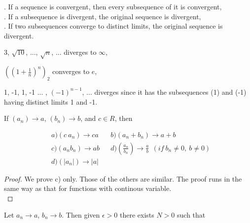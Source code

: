 \documentclass[11pt]{amsbook}
\begin{document}

	. If a sequence is convergent, then every subsequence of it is convergent,\\

	. If a subsequence is divergent, the original sequence is divergent,\\

	. If two subsequences converge to distinct limits, the original sequence is divergent.
\begin{exmp}
	\item\mbox{}
\begin{hEnumerateArabic}
	\item 3, $\sqrt{10}$, ..., $\sqrt{n}$, ... diverges to $\infty$, \\
	\item $((1 + \frac{1}{n})^n)_2$ converges to $e$, \\
	\item 1, -1, 1, -1 ... , $(-1)^{n-1}$, ... diverges since it has the subsequences (1) and (-1) having distinct limits 1 and -1. \\ 
\end{hEnumerateArabic}
\end{exmp}

\begin{thm}
	If $(a_{n}) \rightarrow a$,  $(b_{n}) \rightarrow b$, and  $c \in R$, then 
\end{thm} 
\begin{align*}
	&a) (c\ a_n) \rightarrow ca                   &&b) (a_n + b_n) \rightarrow a + b\\
	&c) (a_{n} b_{n}) \rightarrow ab              &&d) (\frac{a_n}{b_n}) \rightarrow \frac{a}{b}\ \  (if\  b_n \neq 0,\  b \neq 0)\\
	&d) (|a_{n}|) \rightarrow |a|
\end{align*}
\begin{proof}
	We prove c) only. Those of the others are similar. The proof runs in the same way as that for functions with continous variable.\\
\end{proof}
\indent Let $a_n \rightarrow a$,  $b_n \rightarrow b$. Then given $\epsilon > 0$ there exists $N>0$ such that
\end{document}
